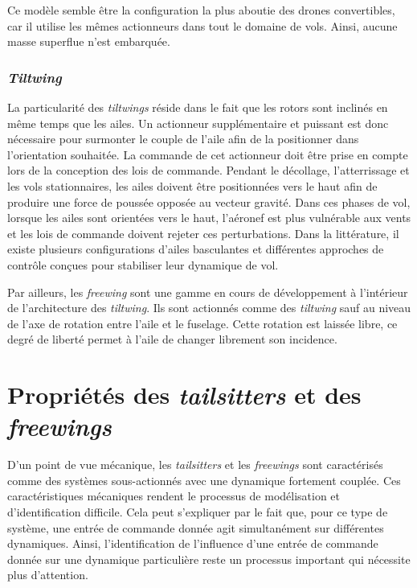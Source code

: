         Ce modèle semble être la configuration la plus aboutie des drones convertibles, car il utilise les mêmes actionneurs dans tout le domaine de vols. Ainsi, aucune masse superflue n'est embarquée.

    
        \subsubsection*{\textit{Tiltwing}} 
        La particularité des \textit{tiltwings} réside dans le fait que les rotors sont inclinés en même temps que les ailes. Un actionneur supplémentaire et puissant est donc nécessaire pour surmonter le couple de l'aile afin de la positionner dans l'orientation souhaitée. La commande de cet actionneur doit être prise en compte lors de la conception des lois de commande. Pendant le décollage, l'atterrissage et les vols stationnaires, les ailes doivent être positionnées vers le haut afin de produire une force de poussée opposée au vecteur gravité. Dans ces phases de vol, lorsque les ailes sont orientées vers le haut, l'aéronef est plus vulnérable aux vents et les lois de commande doivent rejeter ces perturbations. Dans la littérature, il existe plusieurs configurations d'ailes basculantes et différentes approches de contrôle conçues pour stabiliser leur dynamique de vol.

        Par ailleurs, les \textit{freewing} sont une gamme en cours de développement à l'intérieur de l'architecture des \textit{tiltwing}. Ils sont actionnés comme des \textit{tiltwing} sauf au niveau de l'axe de rotation entre l'aile et le fuselage. Cette rotation est laissée libre, ce degré de liberté permet à l'aile de changer librement son incidence.

\section{Propriétés des \textit{tailsitters} et des \textit{freewings}}
    D'un point de vue mécanique, les \textit{tailsitters} et les \textit{freewings} sont caractérisés comme des systèmes sous-actionnés avec une dynamique fortement couplée. Ces caractéristiques mécaniques rendent le processus de modélisation et d'identification difficile. Cela peut s'expliquer par le fait que, pour ce type de système, une entrée de commande donnée agit simultanément sur différentes dynamiques. Ainsi, l'identification de l'influence d'une entrée de commande donnée sur une dynamique particulière reste un processus important qui nécessite plus d'attention.
